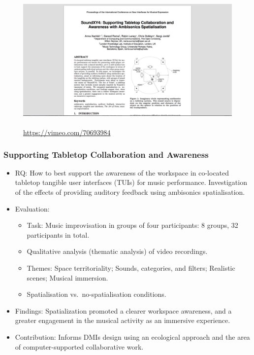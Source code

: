 \documentclass[screen, aspectratio=169]{beamer}
\begin{document}
\begin{frame}
\frametitle{}
\begin{figure}
	\includegraphics[scale=0.31]{img/Xambo-et-al-2014.png}\\
	    \cite{Xambo.et.al.2014}\\
	    \url{https://vimeo.com/70693984}
    \end{figure}		
\end{frame}
%
\begin{frame}
\frametitle{Supporting Tabletop Collaboration and Awareness}	
\begin{itemize}
\item RQ: How to best support the awareness of the workspace in co-located tabletop tangible user interfaces (TUIs) for music performance. Investigation of the effects of providing auditory feedback using ambisonics spatialisation.
\item Evaluation:
\begin{itemize}
\item Task: Music improvisation in groups of four participants: 8 groups, 32 participants in total.
\item Qualitative analysis (thematic analysis) of video recordings.
\item Themes: Space territoriality; Sounds, categories, and filters; Realistic scenes; Musical immersion.
\item Spatialisation vs.\ no-spatialisation conditions.
\end{itemize}
\item Findings: Spatialization promoted a clearer workspace awareness, and a greater engagement in the musical activity as an immersive experience.
\item Contribution: Informs DMIs design using an ecological approach and the area of computer-supported collaborative work.
\end{itemize}
\end{frame}
\end{document}
